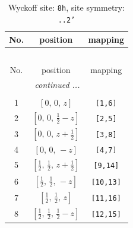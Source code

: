 \documentclass[fleqn,8pt]{jsarticle}
\begin{document}
\begin{longtable}{ccc}
\caption{Wyckoff site: {\tt 8h}, site symmetry: {\tt ..2'}}
 \\
 \hline \hline
No. & position & mapping \\ \hline \endfirsthead

\multicolumn{2}{l}{\tablename\ \thetable{}} \\
 \hline \hline
No. & position & mapping \\ \hline \endhead

 \hline \hline
\multicolumn{2}{r}{\footnotesize\it continued ...} \\ \endfoot

 \hline \hline
\multicolumn{2}{r}{} \\ \endlastfoot

1 & $\left[ 0,\, 0,\, z \right]$ & {\tt [1,6]} \\ \hline
2 & $\left[ 0,\, 0,\, \frac{1}{2} - z \right]$ & {\tt [2,5]} \\ \hline
3 & $\left[ 0,\, 0,\, z + \frac{1}{2} \right]$ & {\tt [3,8]} \\ \hline
4 & $\left[ 0,\, 0,\, - z \right]$ & {\tt [4,7]} \\ \hline
5 & $\left[ \frac{1}{2},\, \frac{1}{2},\, z + \frac{1}{2} \right]$ & {\tt [9,14]} \\ \hline
6 & $\left[ \frac{1}{2},\, \frac{1}{2},\, - z \right]$ & {\tt [10,13]} \\ \hline
7 & $\left[ \frac{1}{2},\, \frac{1}{2},\, z \right]$ & {\tt [11,16]} \\ \hline
8 & $\left[ \frac{1}{2},\, \frac{1}{2},\, \frac{1}{2} - z \right]$ & {\tt [12,15]} \\
\end{longtable}
\renewcommand{\arraystretch}{1.2}
\end{document}
